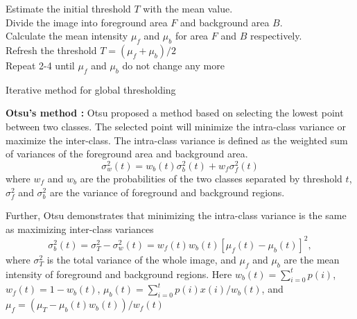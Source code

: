 \begin{algorithm}
\SetAlgoLined
{}
Estimate the initial threshold $T$ with the mean value.\\
Divide the image into foreground area $F$ and background area $B$.\\
Calculate the mean intensity $\mu_f$ and $\mu_b$ for area $F$ and $B$ respectively.\\
Refresh the threshold $T = (\mu_f + \mu_b)/2$\\
Repeat 2-4 until $\mu_f$ and $\mu_b$ do not change any more
\caption{Iterative method for global thresholding}
\label{alg:global-thresh}
\end{algorithm}
\textbf{Otsu's method : } Otsu \cite{otsu1975threshold} proposed a method based on selecting the lowest point between two classes. The selected point will minimize the intra-class variance or maximize the inter-class. The intra-class variance is defined as the weighted sum of variances of the foreground area and background area.
\begin{equation} \label{eq:intra-var}
\sigma_w^2(t) = w_b(t)\sigma_b^2(t) + w_f\sigma_f^2(t)
\end{equation}
where $w_f$ and $w_b$ are the probabilities of the two classes separated by threshold $t$, $\sigma_f^2$ and $\sigma_b^2$ are the variance of foreground and background regions.

Further, Otsu demonstrates that minimizing the intra-class variance is the same as maximizing inter-class variances
\begin{equation} \label{eq:inter-var}
\sigma_b^2(t) = \sigma_T^2 - \sigma_w^2(t) = w_f(t)w_b(t)[\mu_f(t) - \mu_b(t)]^2,
\end{equation}
where $\sigma_T^2$ is the total variance of the whole image, and $\mu_f$ and $\mu_b$ are the mean intensity of foreground and background regions. Here $w_b(t) = \sum_{i=0}^tp(i)$, $w_f(t) = 1 - w_b(t)$, $\mu_b(t) = \sum_{i=0}^tp(i)x(i)/w_b(t)$, and $\mu_f = (\mu_T - \mu_b(t)w_b(t))/w_f(t)$

